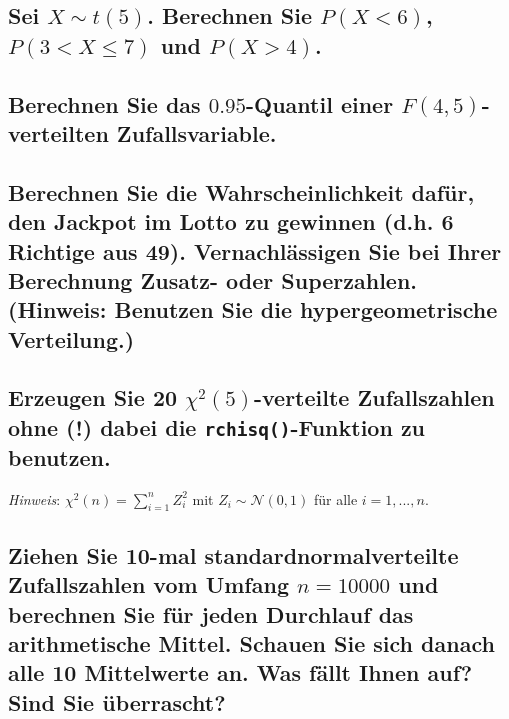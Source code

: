 \documentclass[12pt,a4paper]{article}
\begin{document}
\subsection{\texorpdfstring{Sei \(X\sim t(5)\). Berechnen Sie
\(P(X<6)\), \(P(3<X\leq7)\) und
\(P(X>4)\).}{Sei X\textbackslash sim t(5). Berechnen Sie P(X\textless6), P(3\textless X\textbackslash leq7) und P(X\textgreater4).}}\label{sei-xsim-t5.-berechnen-sie-px6-p3xleq7-und-px4.}

\subsection{\texorpdfstring{Berechnen Sie das \(0.95\)-Quantil einer
\(F(4, 5)\)-verteilten
Zufallsvariable.}{Berechnen Sie das 0.95-Quantil einer F(4, 5)-verteilten Zufallsvariable.}}\label{berechnen-sie-das-0.95-quantil-einer-f4-5-verteilten-zufallsvariable.}

\subsection{Berechnen Sie die Wahrscheinlichkeit dafür, den Jackpot im
Lotto zu gewinnen (d.h. 6 Richtige aus 49). Vernachlässigen Sie bei
Ihrer Berechnung Zusatz- oder Superzahlen. (Hinweis: Benutzen Sie die
hypergeometrische
Verteilung.)}\label{berechnen-sie-die-wahrscheinlichkeit-dafuxfcr-den-jackpot-im-lotto-zu-gewinnen-d.h.-6-richtige-aus-49.-vernachluxe4ssigen-sie-bei-ihrer-berechnung-zusatz--oder-superzahlen.-hinweis-benutzen-sie-die-hypergeometrische-verteilung.}

\subsection{\texorpdfstring{Erzeugen Sie 20 \(\chi^2(5)\)-verteilte
Zufallszahlen ohne (!) dabei die \texttt{rchisq()}-Funktion zu
benutzen.}{Erzeugen Sie 20 \textbackslash chi\^{}2(5)-verteilte Zufallszahlen ohne (!) dabei die rchisq()-Funktion zu benutzen.}}\label{erzeugen-sie-20-chi25-verteilte-zufallszahlen-ohne-dabei-die-rchisq-funktion-zu-benutzen.}

\emph{Hinweis}: \(\chi^2(n)=\sum_{i=1}^n Z_i^2\) mit
\(Z_i\sim\mathcal{N}(0,1)\) für alle \(i=1,...,n\).

\subsection{\texorpdfstring{Ziehen Sie 10-mal standardnormalverteilte
Zufallszahlen vom Umfang \(n = 10000\) und berechnen Sie für jeden
Durchlauf das arithmetische Mittel. Schauen Sie sich danach alle 10
Mittelwerte an. Was fällt Ihnen auf? Sind Sie
überrascht?}{Ziehen Sie 10-mal standardnormalverteilte Zufallszahlen vom Umfang n = 10000 und berechnen Sie für jeden Durchlauf das arithmetische Mittel. Schauen Sie sich danach alle 10 Mittelwerte an. Was fällt Ihnen auf? Sind Sie überrascht?}}\label{ziehen-sie-10-mal-standardnormalverteilte-zufallszahlen-vom-umfang-n-10000-und-berechnen-sie-fuxfcr-jeden-durchlauf-das-arithmetische-mittel.-schauen-sie-sich-danach-alle-10-mittelwerte-an.-was-fuxe4llt-ihnen-auf-sind-sie-uxfcberrascht}
\end{document}
